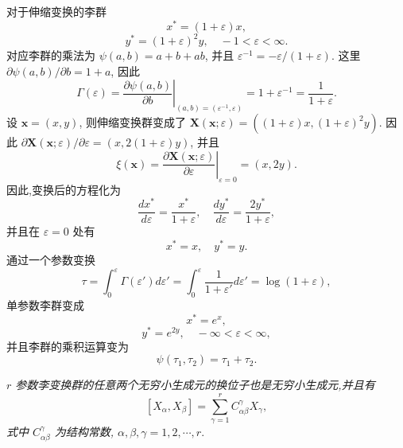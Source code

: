 对于伸缩变换的李群
\begin{equation*}
	x^*=(1+\varepsilon)x,
\end{equation*}
\begin{equation*}
	y^*=(1+\varepsilon)^2y,\quad -1<\varepsilon<\infty.
\end{equation*}
对应李群的乘法为 $\psi(a,b)=a+b+ab$, 并且 $\varepsilon^{-1}=-\varepsilon/(1+\varepsilon)$. 这里 $\partial \psi(a,b)/\partial b=1+a$, 因此
\begin{equation*}
	\Gamma(\varepsilon) = \left.\frac{\partial \psi(a,b)}{\partial b}\right|_{(a,b)=(\varepsilon^{-1},\varepsilon)}=1+\varepsilon^{-1}=\frac{1}{1+\varepsilon}.
\end{equation*}
设 $\mathbf{x}=(x,y)$, 则伸缩变换群变成了 $\mathbf{X}(\mathbf{x};\varepsilon)=((1+\varepsilon)x,(1+\varepsilon)^2y)$. 因此 $\partial \mathbf{X}(\mathbf{x};\varepsilon)/\partial \varepsilon=(x,2(1+\varepsilon)y)$, 并且
\begin{equation*}
	\xi(\mathbf{x})=\left.\frac{\partial \mathbf{X}(\mathbf{x};\varepsilon)}{\partial \varepsilon}\right|_{\varepsilon=0}=(x,2y).
\end{equation*}
因此,变换后的方程化为
\begin{equation*}
	\frac{dx^*}{d\varepsilon}=\frac{x^*}{1+\varepsilon},\quad \frac{dy^*}{d\varepsilon}=\frac{2y^*}{1+\varepsilon},
\end{equation*}
并且在 $\varepsilon=0$ 处有
\begin{equation*}
	x^*=x,\quad y^*=y.
\end{equation*}
通过一个参数变换
\begin{equation*}
	\tau=\int_{0}^{\varepsilon}\Gamma(\varepsilon ')d\varepsilon '=\int_{0}^{\varepsilon}\frac{1}{1+\varepsilon '}d\varepsilon ' = \log(1+\varepsilon),
\end{equation*}
单参数李群变成
\begin{equation*}
	x^*=e^x,
\end{equation*}
\begin{equation*}
	y^*=e^{2y},\quad -\infty<\varepsilon<\infty,
\end{equation*}
并且李群的乘积运算变为
\begin{equation*}
	\psi(\tau_1,\tau_2)=\tau_1+\tau_2.
\end{equation*}

\begin{theorem}[李第二基本定理]
\emph{$r$ 参数李变换群的任意两个无穷小生成元的换位子也是无穷小生成元,并且有
\begin{equation}\label{eq:liec}
[X_\alpha,X_\beta] =\sum_{\gamma=1}^{r}C_{\alpha\beta}^{\gamma}X_{\gamma},
\end{equation}
式中 $C_{\alpha\beta}^{\gamma}$ 为结构常数, $\alpha,\beta,\gamma=1,2,\cdots,r.$}
\end{theorem}

